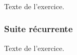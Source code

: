 \documentclass{article}
\begin{document}
    \subsubsection{}%

    Texte de l'exercice.

    \subsubsection{Suite récurrente}%

    Texte de l'exercice.

    
\end{document}
